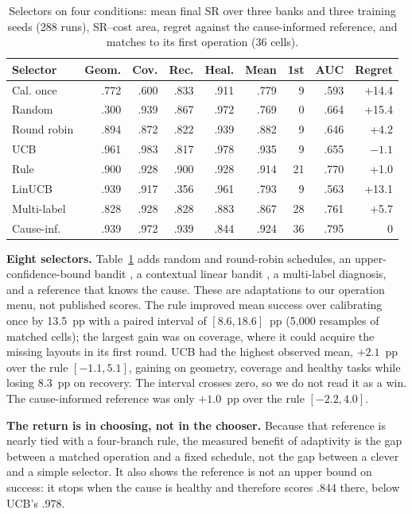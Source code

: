 \documentclass[conference]{IEEEtran}
\begin{document}
\begin{table}[t]
\centering\caption{Selectors on four conditions: mean final SR over three banks and three training seeds (288 runs), SR--cost area, regret against the cause-informed reference, and matches to its first operation (36 cells).}\label{tab:selectors}
\setlength{\tabcolsep}{3.6pt}
\begin{tabular}{@{}lrrrrrrrr@{}}\toprule
Selector & Geom. & Cov. & Rec. & Heal. & Mean & 1st & AUC & Regret\\\midrule
Cal. once & .772 & .600 & .833 & .911 & .779 & 9 & .593 & +14.4\\
Random & .300 & .939 & .867 & .972 & .769 & 0 & .664 & +15.4\\
Round robin & .894 & .872 & .822 & .939 & .882 & 9 & .646 & +4.2\\
UCB & .961 & .983 & .817 & .978 & .935 & 9 & .655 & $-1.1$\\
Rule & .900 & .928 & .900 & .928 & .914 & 21 & .770 & +1.0\\
LinUCB & .939 & .917 & .356 & .961 & .793 & 9 & .563 & +13.1\\
Multi-label & .828 & .928 & .828 & .883 & .867 & 28 & .761 & +5.7\\
Cause-inf. & .939 & .972 & .939 & .844 & .924 & 36 & .795 & 0\\\bottomrule
\end{tabular}
\end{table}
\textbf{Eight selectors.} Table~\ref{tab:selectors} adds random and round-robin schedules, an upper-confidence-bound bandit \cite{auer2002ucb}, a contextual linear bandit \cite{linucb}, a multi-label diagnosis, and a reference that knows the cause. These are adaptations to our operation menu, not published scores. The rule improved mean success over calibrating once by 13.5~pp with a paired interval of $[8.6,18.6]$~pp (5,000 resamples of matched cells); the largest gain was on coverage, where it could acquire the missing layouts in its first round. UCB had the highest observed mean, $+2.1$~pp over the rule $[-1.1,5.1]$, gaining on geometry, coverage and healthy tasks while losing 8.3~pp on recovery. The interval crosses zero, so we do not read it as a win. The cause-informed reference was only $+1.0$~pp over the rule $[-2.2,4.0]$.

\textbf{The return is in choosing, not in the chooser.} Because that reference is nearly tied with a four-branch rule, the measured benefit of adaptivity is the gap between a matched operation and a fixed schedule, not the gap between a clever and a simple selector. It also shows the reference is not an upper bound on success: it stops when the cause is healthy and therefore scores .844 there, below UCB's .978.
\end{document}
